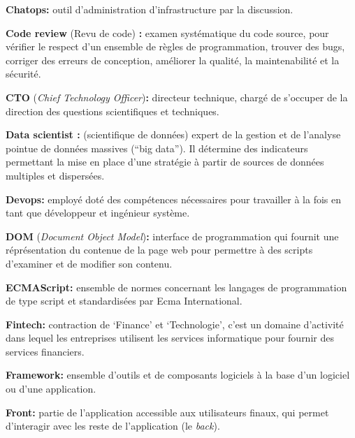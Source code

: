 \documentclass[12pt,a4paper]{article}
\begin{document}
  \textbf{Chatops:} outil d'administration d'infrastructure par la
  discussion.

  \bigskip

  \textbf{Code review} (Revu de code) \textbf{:} examen systématique du
  code source, pour vérifier le respect d'un ensemble de règles de
  programmation, trouver des bugs, corriger des erreurs de conception,
  améliorer la qualité, la maintenabilité et la sécurité.

  \bigskip

  \textbf{CTO} (\emph{Chief Technology Officer})\textbf{:} directeur
  technique, chargé de s'occuper de la direction des questions
  scientifiques et techniques.

  \bigskip

  \textbf{Data scientist :} (scientifique de données) expert de la gestion
  et de l'analyse pointue de données massives (``big data''). Il détermine
  des indicateurs permettant la mise en place d'une stratégie à partir de
  sources de données multiples et dispersées.

  \bigskip

  \textbf{Devops:} employé doté des compétences nécessaires pour
  travailler à la fois en tant que développeur et ingénieur système.

  \bigskip

  \textbf{DOM} (\emph{Document Object Model})\textbf{:} interface de
  programmation qui fournit une réprésentation du contenue de la page web
  pour permettre à des scripts d'examiner et de modifier son contenu.

  \bigskip

  \textbf{ECMAScript:} ensemble de normes concernant les langages de
  programmation de type script et standardisées par Ecma International.

  \bigskip

  \textbf{Fintech:} contraction de `Finance' et `Technologie', c'est un
  domaine d'activité dans lequel les entreprises utilisent les services
  informatique pour fournir des services financiers.

  \bigskip

  \textbf{Framework:} ensemble d'outils et de composants logiciels à la
  base d'un logiciel ou d'une application.

  \bigskip

  \textbf{Front:} partie de l'application accessible aux utilisateurs
  finaux, qui permet d'interagir avec les reste de l'application (le
  \emph{back}).
\end{document}
